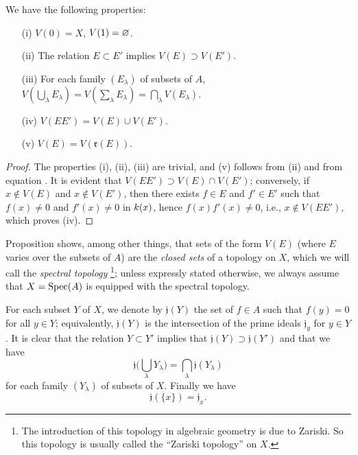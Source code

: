 \begin{proposition}[1.1.2]
\label{1.1.1.2}
We have the following properties:
\begin{enumerate}
  \item[{\rm(i)}] $V(0)=X$, $V(1)=\varnothing$.
  \item[{\rm(ii)}] The relation $E\subset E'$ implies $V(E)\supset V(E')$.
  \item[{\rm(iii)}] For each family $(E_\lambda)$ of subsets of $A$, $V(\bigcup_\lambda E_\lambda)=V(\sum_\lambda E_\lambda)=\bigcap_\lambda V(E_\lambda)$.
  \item[{\rm(iv)}] $V(EE')=V(E)\cup V(E')$.
  \item[{\rm(v)}] $V(E)=V(\mathfrak{r}(E))$.
\end{enumerate}
\end{proposition}

\begin{proof}
\label{proof-1.1.1.2}
The properties (i), (ii), (iii) are trivial, and (v) follows from (ii) and from equation .
It is evident that $V(EE')\supset V(E)\cap V(E')$;
conversely, if $x\not\in V(E)$ and $x\not\in V(E')$, then there exists $f\in E$ and $f'\in E'$ such that $f(x)\neq 0$ and $f'(x)\neq 0$ in $k(x)$, hence $f(x)f'(x)\neq 0$, i.e., $x\not\in V(EE')$, which proves (iv).
\end{proof}

Proposition  shows, among other things, that sets of the form $V(E)$ (where $E$ varies over the subsets of $A$) are the \emph{closed sets} of a topology on $X$, which we will call the \emph{spectral topology}
\footnote{The introduction of this topology in algebraic geometry is due to Zariski.
So this topology is usually called the ``Zariski topology'' on $X$.};
unless expressly stated otherwise, we always assume that $X=\operatorname{Spec}(A)$ is equipped with the spectral topology.

\begin{env}[1.1.3]
\label{1.1.1.3}
For each subset $Y$ of $X$, we denote by $\mathfrak{j}(Y)$ the set of $f\in A$ such that $f(y)=0$ for all $y\in Y$;
equivalently, $\mathfrak{j}(Y)$ is the intersection of the prime ideals $\mathfrak{j}_y$ for $y\in Y$.
It is clear that the relation $Y\subset Y'$ implies that $\mathfrak{j}(Y)\supset\mathfrak{j}(Y')$ and that we have
\[
  \mathfrak{j}\bigg(\bigcup_\lambda Y_\lambda\bigg)=\bigcap_\lambda\mathfrak{j}(Y_\lambda)
  \tag{1.1.3.1}
\]
for each family $(Y_\lambda)$ of subsets of $X$.
Finally we have
\[
  \mathfrak{j}(\{x\})=\mathfrak{j}_x.
  \tag{1.1.3.2}
\]
\end{env}

